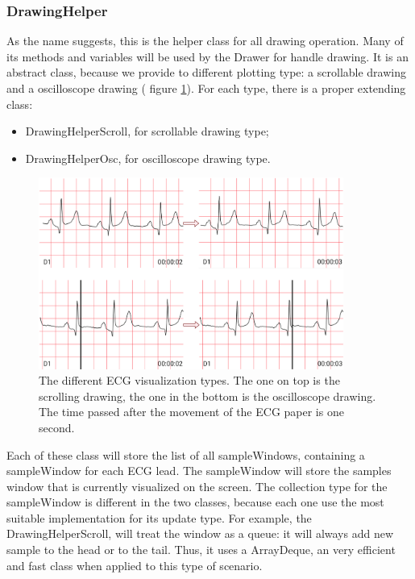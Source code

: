\subsubsection{DrawingHelper}
As the name suggests, this is the helper class for all drawing operation. Many of its methods and variables will be used by the Drawer for handle drawing. It is an abstract class, because we provide to different plotting type: a scrollable drawing and a oscilloscope drawing ( figure \ref*{fig9.9}). For each type, there is a proper extending  class:
\begin{itemize}
	\item DrawingHelperScroll, for scrollable drawing type;
	\item DrawingHelperOsc, for oscilloscope drawing type.
\end{itemize}
\begin{figure}[ht!]
	\centering
	\includegraphics[width=100mm]{figures/ch9/9.png}
	\caption{The different ECG visualization types. The one on top is the scrolling drawing, the one in the bottom is the oscilloscope drawing. The time passed after the movement of the ECG paper is one second.}
	\label{fig9.9}
\end{figure}
Each of these class will store the list of all sampleWindows, containing a sampleWindow for each ECG lead. The sampleWindow will store the samples window that is currently visualized on the screen. The collection type for the sampleWindow is different in the two classes, because each one use the most suitable implementation for its update type. For example, the DrawingHelperScroll, will treat the window as a queue: it will always add new sample to the head or to the tail. Thus, it uses a ArrayDeque, an very efficient and fast class when applied to this type of scenario.\\
